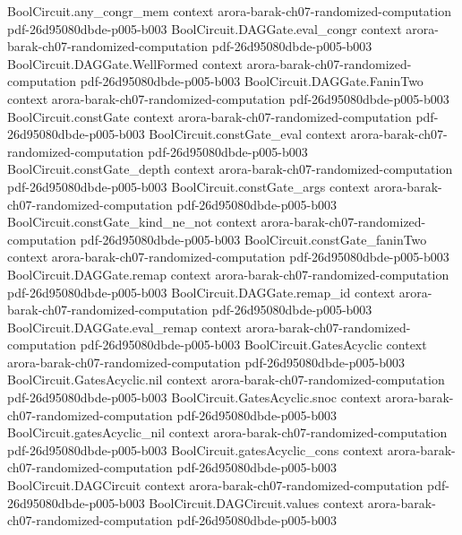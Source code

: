 \begin{theorem}
  {BoolCircuit.any_congr_mem}
  {context}
  {arora-barak-ch07-randomized-computation}
  {pdf-26d95080dbde-p005-b003}
\proofstep
  {BoolCircuit.DAGGate.eval_congr}
  {context}
  {arora-barak-ch07-randomized-computation}
  {pdf-26d95080dbde-p005-b003}
\proofstep
  {BoolCircuit.DAGGate.WellFormed}
  {context}
  {arora-barak-ch07-randomized-computation}
  {pdf-26d95080dbde-p005-b003}
\proofstep
  {BoolCircuit.DAGGate.FaninTwo}
  {context}
  {arora-barak-ch07-randomized-computation}
  {pdf-26d95080dbde-p005-b003}
\proofstep
  {BoolCircuit.constGate}
  {context}
  {arora-barak-ch07-randomized-computation}
  {pdf-26d95080dbde-p005-b003}
\proofstep
  {BoolCircuit.constGate_eval}
  {context}
  {arora-barak-ch07-randomized-computation}
  {pdf-26d95080dbde-p005-b003}
\proofstep
  {BoolCircuit.constGate_depth}
  {context}
  {arora-barak-ch07-randomized-computation}
  {pdf-26d95080dbde-p005-b003}
\proofstep
  {BoolCircuit.constGate_args}
  {context}
  {arora-barak-ch07-randomized-computation}
  {pdf-26d95080dbde-p005-b003}
\proofstep
  {BoolCircuit.constGate_kind_ne_not}
  {context}
  {arora-barak-ch07-randomized-computation}
  {pdf-26d95080dbde-p005-b003}
\proofstep
  {BoolCircuit.constGate_faninTwo}
  {context}
  {arora-barak-ch07-randomized-computation}
  {pdf-26d95080dbde-p005-b003}
\proofstep
  {BoolCircuit.DAGGate.remap}
  {context}
  {arora-barak-ch07-randomized-computation}
  {pdf-26d95080dbde-p005-b003}
\proofstep
  {BoolCircuit.DAGGate.remap_id}
  {context}
  {arora-barak-ch07-randomized-computation}
  {pdf-26d95080dbde-p005-b003}
\proofstep
  {BoolCircuit.DAGGate.eval_remap}
  {context}
  {arora-barak-ch07-randomized-computation}
  {pdf-26d95080dbde-p005-b003}
\proofstep
  {BoolCircuit.GatesAcyclic}
  {context}
  {arora-barak-ch07-randomized-computation}
  {pdf-26d95080dbde-p005-b003}
\proofstep
  {BoolCircuit.GatesAcyclic.nil}
  {context}
  {arora-barak-ch07-randomized-computation}
  {pdf-26d95080dbde-p005-b003}
\proofstep
  {BoolCircuit.GatesAcyclic.snoc}
  {context}
  {arora-barak-ch07-randomized-computation}
  {pdf-26d95080dbde-p005-b003}
\proofstep
  {BoolCircuit.gatesAcyclic_nil}
  {context}
  {arora-barak-ch07-randomized-computation}
  {pdf-26d95080dbde-p005-b003}
\proofstep
  {BoolCircuit.gatesAcyclic_cons}
  {context}
  {arora-barak-ch07-randomized-computation}
  {pdf-26d95080dbde-p005-b003}
\proofstep
  {BoolCircuit.DAGCircuit}
  {context}
  {arora-barak-ch07-randomized-computation}
  {pdf-26d95080dbde-p005-b003}
\proofstep
  {BoolCircuit.DAGCircuit.values}
  {context}
  {arora-barak-ch07-randomized-computation}
  {pdf-26d95080dbde-p005-b003}
\proofstep

\end{theorem}
